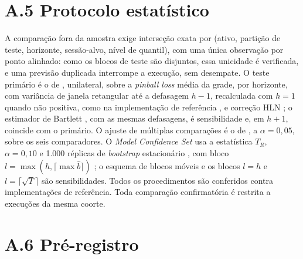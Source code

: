 \section*{A.5 Protocolo estatístico}

A comparação fora da amostra exige interseção exata por (ativo, partição de teste, horizonte, sessão-alvo, nível de quantil), com uma única observação por ponto alinhado: como os blocos de teste são disjuntos, essa unicidade é verificada, e uma previsão duplicada interrompe a execução, sem desempate. O teste primário é o de , unilateral, sobre a \textit{pinball loss} média da grade, por horizonte, com variância de janela retangular até a defasagem \(h-1\), recalculada com \(h = 1\) quando não positiva, como na implementação de referência \cite{RFORECAST}, e correção HLN \cite{HARVEY1997}; o estimador de Bartlett \cite{NEWEYWEST1987}, com as mesmas defasagens, é sensibilidade e, em \(h+1\), coincide com o primário. O ajuste de múltiplas comparações é o de , a \(\alpha = 0{,}05\), sobre os seis comparadores. O \textit{Model Confidence Set} \cite{HANSEN2011MCS} usa a estatística \(T_R\), \(\alpha = 0{,}10\) e 1.000 réplicas de \textit{bootstrap} estacionário \cite{POLITISROMANO1994}, com bloco \(l = \max(h, \lceil \max \hat{b} \rceil)\) \cite{POLITISWHITE2004,PATTON2009}; o esquema de blocos móveis e os blocos \(l = h\) e \(l = \lceil\sqrt{T}\rceil\) são sensibilidades. Todos os procedimentos são conferidos contra implementações de referência. Toda comparação confirmatória é restrita a execuções da mesma coorte.

\section*{A.6 Pré-registro}

